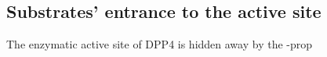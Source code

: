 \subsection{Substrates' entrance to the active site}

The enzymatic active site of DPP4 is hidden away by the \beta-prop